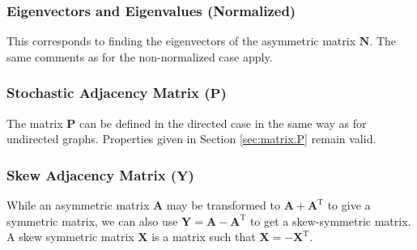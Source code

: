 \documentclass{article}
\begin{document}
\subsubsection{Eigenvectors and Eigenvalues (Normalized)}
\label{sec:matrix.diag-n}
This corresponds to finding the eigenvectors of the asymmetric matrix
$\mathbf N$. 
The same comments as for the non-normalized case apply. 

\subsubsection{Stochastic Adjacency Matrix ($\mathbf P$)}
The matrix $\mathbf P$ can be defined in the directed case in the same
way as for undirected graphs.  Properties given in Section
\ref{sec:matrix.P} remain valid. 

\subsubsection{Skew Adjacency Matrix ($\mathbf Y$)}
\label{sec:matrix.skew}
While an asymmetric matrix $\mathbf A$ may be transformed to $\mathbf A
+ \mathbf A^{\mathrm T}$ to give a symmetric matrix, we can also use
$\mathbf Y = \mathbf A - \mathbf A^{\mathrm T}$ to get a skew-symmetric matrix.  A
skew symmetric matrix $\mathbf X$ is a matrix such that $\mathbf X =
-\mathbf X^{\mathrm T}$.
\end{document}
